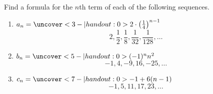 \begin{frame}
\begin{example}
Find a formula for the $n$th term of each of the following sequences.  
\begin{enumerate}
\item<alert@2-3>  $a_n = \uncover<3-| handout:0>{2\cdot \big(\frac{1}{4}\big)^{n-1}}$
\[
2, \frac{1}{2},\frac{1}{8},\frac{1}{32},\frac{1}{128},\ldots
\]
\item<alert@4-5>  $b_n = \uncover<5-| handout:0>{(-1)^nn^2}$
\[
-1,4,-9,16,-25,\ldots
\]
\item<alert@6-7>  $c_n = \uncover<7-| handout:0>{-1+6(n-1)}$
\[
-1,5,11,17,23,\ldots
\]
\end{enumerate}
\end{example}

\end{frame}
